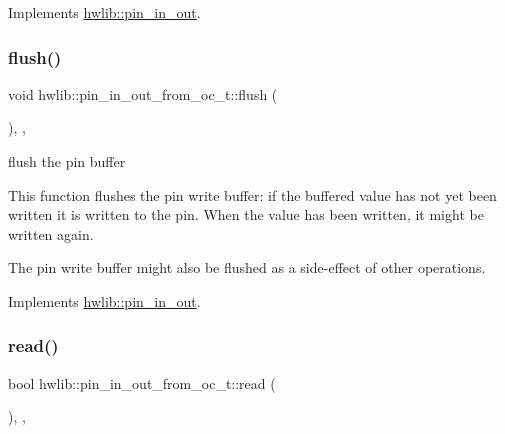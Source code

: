 Implements \hyperlink{classhwlib_1_1pin__in__out_ad08a5f5e9a4c3aadaa7c665b98f2418e}{hwlib\+::pin\+\_\+in\+\_\+out}.

\mbox{\label{classhwlib_1_1pin__in__out__from__oc__t_a69c975d51ed408a8abb62924c59e9cdb}} 
\subsubsection{\texorpdfstring{flush()}{flush()}}
{\footnotesize\ttfamily void hwlib\+::pin\+\_\+in\+\_\+out\+\_\+from\+\_\+oc\+\_\+t\+::flush (\begin{DoxyParamCaption}{ }\end{DoxyParamCaption})\hspace{0.3cm}{\ttfamily [inline]}, {\ttfamily [override]}, {\ttfamily [virtual]}}

flush the pin buffer

This function flushes the pin write buffer\+: if the buffered value has not yet been written it is written to the pin. When the value has been written, it might be written again.

The pin write buffer might also be flushed as a side-\/effect of other operations. 

Implements \hyperlink{classhwlib_1_1pin__in__out_a5207c9e30f0c88e4c052952397c2da88}{hwlib\+::pin\+\_\+in\+\_\+out}.

\mbox{\label{classhwlib_1_1pin__in__out__from__oc__t_ae9345a726556cf5ac138f575df044722}} 
\subsubsection{\texorpdfstring{read()}{read()}}
{\footnotesize\ttfamily bool hwlib\+::pin\+\_\+in\+\_\+out\+\_\+from\+\_\+oc\+\_\+t\+::read (\begin{DoxyParamCaption}{ }\end{DoxyParamCaption})\hspace{0.3cm}{\ttfamily [inline]}, {\ttfamily [override]}, {\ttfamily [virtual]}}

